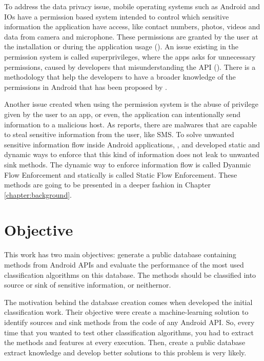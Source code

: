 To address the data privacy issue, mobile operating systems such as Android and IOs have a permission based system intended to control which sensitive information the application have access, like contact numbers, photos, videos and data from camera and microphone. These permissions are granted by the user at the installation or during the application usage (\cite{androidpermissions}). An issue existing in the permission system is called superprivileges, where the apps asks for unnecessary permissions, caused by developers that misunderstanding the API (\cite{felt2011android}). There is a methodology that help the developers to have a broader knowledge of the permissions in Android that has been proposed by \cite{barrera2010methodology}.

Another issue created when using the permission system is the abuse of privilege given by the user to an app, or even, the application can intentionally send information to a malicious host. As \cite{jiang2012dissecting} reports, there are malwares that are capable to steal sensitive information from the user, like SMS. To solve unwanted sensitive information flow inside Android applications, \cite{arzt2014flowdroid}, \cite{wei2014amandroid} and \cite{gordon2015information} developed static and dynamic ways to enforce that this kind of information does not leak to unwanted sink methods. The dynamic way to enforce information flow is called Dyanmic Flow Enforcement and statically is called Static Flow Enforcement. These methods are going to be presented in a deeper fashion in Chapter \ref{chapter:background}.


\section{Objective}\label{section:background}

This work has two main objectives: generate a public database containing methods from Android APIs and evaluate the performance of the most used classification algorithms on this database. The methods should be classified into source or sink of sensitive information, or neithernor.

The motivation behind the database creation comes when \cite{rasthofer2014machine} developed the initial classification work. Their objective were create a machine-learning solution to identify sources and sink methods from the code of any Android API. So, every time that you wanted to test other classification algorithms, you had  to extract the methods and features at every execution. Then, create a public database extract knowledge and  develop better solutions to this problem is very likely.

